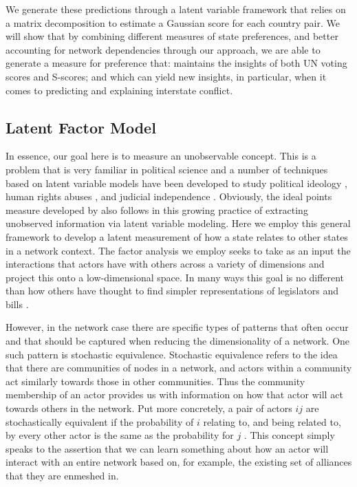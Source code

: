 We generate these predictions through a latent variable framework that relies on a matrix decomposition to estimate a Gaussian score for each country pair. We will show that by combining different measures of state preferences, and better accounting for network dependencies through our approach, we are able to generate a measure for preference that: maintains the insights of both UN voting scores and S-scores; and which can yield new insights, in particular, when it comes to predicting and explaining interstate conflict.

\subsection*{Latent Factor Model}

In essence, our goal here is to measure an unobservable concept. This is a problem that is very familiar in political science and a number of techniques based on latent variable models have been developed to study political ideology \citep{martin:quinn:2002,konig:etal:2013}, human rights abuses \citep{fariss:2014}, and judicial independence \citep{linzer:staton:2015}. Obviously, the ideal points measure developed by \citet{bailey:etal:2015} also follows in this growing practice of extracting unobserved information via latent variable modeling. Here we employ this general framework to develop a latent measurement of how a state relates to other states in a network context. The factor analysis we employ seeks to take as an input the interactions that actors have with others across a variety of dimensions and project this onto a low-dimensional space. In many ways this goal is no different than how others have thought to find simpler representations of legislators and bills \citep{poole:rosenthal:1985,clinton:etal:2004}.

However, in the network case there are specific types of patterns that often occur and that should be captured when reducing the dimensionality of a network. One such pattern is stochastic equivalence. Stochastic equivalence refers to the idea that there are communities of nodes in a network, and actors within a community act similarly towards those in other communities. Thus the community membership of an actor provides us with information on how that actor will act towards others in the network. Put more concretely, a pair of actors $ij$ are stochastically equivalent if the probability of $i$ relating to, and being related to, by every other actor is the same as the probability for $j$ \citep{anderson:etal:1992}. This concept simply speaks to the assertion that we can learn something about how an actor will interact with an entire network based on, for example, the existing set of alliances that they are enmeshed in.

